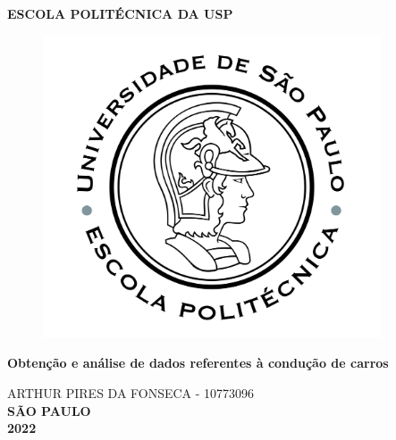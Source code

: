 \thispagestyle{empty}

\vfill
 \begin{center}
    {\large\bfseries ESCOLA POLITÉCNICA DA USP} \\
    \vspace*{1in}
    \begin{figure}[h]
     \centering
            \includegraphics[width=10cm]{figures/Logo_Poli.jpg}\\
     \end{figure}
    \vspace*{1in}
    \large\bfseries Obtenção e análise de dados referentes à condução de carros
    
    \vspace{1.5cm}
    ARTHUR PIRES DA FONSECA - 10773096\\
    \vfill
    \large\bfseries{ SÃO PAULO \\ 2022}
\end{center}

\normalsize